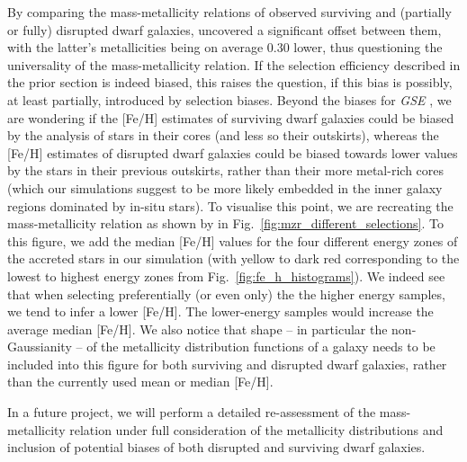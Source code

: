 \documentclass[fleqn,usenatbib]{mnras}
\begin{document}
By comparing the mass-metallicity relations of observed surviving and (partially or fully) disrupted dwarf galaxies, \citet{Naidu2022b} uncovered a significant offset between them, with the latter's metallicities being on average 0.30 lower, thus questioning the universality of the mass-metallicity relation. If the selection efficiency described in the prior section is indeed biased, this raises the question, if this bias is possibly, at least partially, introduced by selection biases. Beyond the biases for \textit{GSE} \citep{Skuladottir2025}, we are wondering if the [Fe/H] estimates of surviving dwarf galaxies could be biased by the analysis of stars in their cores (and less so their outskirts), whereas the [Fe/H] estimates of disrupted dwarf galaxies could be biased towards lower values by the stars in their previous outskirts, rather than their more metal-rich cores (which our simulations suggest to be more likely embedded in the inner galaxy regions dominated by in-situ stars). To visualise this point, we are recreating the mass-metallicity relation as shown by \citet{Naidu2022b} in Fig.~\ref{fig:mzr_different_selections}. To this figure, we add the median [Fe/H] values for the four different energy zones of the accreted stars in our simulation (with yellow to dark red corresponding to the lowest to highest energy zones from Fig.~\ref{fig:fe_h_histograms}). We indeed see that when selecting preferentially (or even only) the the higher energy samples, we tend to infer a lower [Fe/H]. The lower-energy samples would increase the average median [Fe/H]. We also notice that shape -- in particular the non-Gaussianity -- of the metallicity distribution functions of a galaxy needs to be included into this figure for both surviving and disrupted dwarf galaxies, rather than the currently used mean or median [Fe/H].

In a future project, we will perform a detailed re-assessment of the mass-metallicity relation under full consideration of the metallicity distributions and inclusion of potential biases of both disrupted and surviving dwarf galaxies.%
\end{document}
